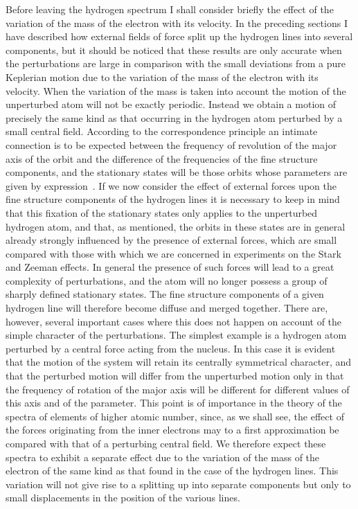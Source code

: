  Before leaving the hydrogen
spectrum I shall consider briefly the effect of the variation of
the mass of the electron with its velocity. In the preceding sections
I have described how external fields of force split up the hydrogen
lines into several components, but it should be noticed that these
results are only accurate when the perturbations are large in comparison
with the small deviations from a pure Keplerian motion
due to the variation of the mass of the electron with its velocity.
When the variation of the mass is taken into account the motion
of the unperturbed atom will not be exactly periodic. Instead we
obtain a motion of precisely the same kind as that occurring in the
hydrogen atom perturbed by a small central field. According to
the correspondence principle an intimate connection is to be expected
between the frequency of revolution of the major axis of the
orbit and the difference of the frequencies of the fine structure
components, and the stationary states will be those orbits whose
parameters are given by expression~. If we now consider the
effect of external forces upon the fine structure components of the
hydrogen lines it is necessary to keep in mind that this fixation of
the stationary states only applies to the unperturbed hydrogen
atom, and that, as mentioned, the orbits in these states are in
general already strongly influenced by the presence of external
forces, which are small compared with those with which we are
concerned in experiments on the Stark and Zeeman effects. In
general the presence of such forces will lead to a great complexity
of perturbations, and the atom will no longer possess a group of
sharply defined stationary states. The fine structure components
of a given hydrogen line will therefore become diffuse and merged
together. There are, however, several important cases where this
does not happen on account of the simple character of the perturbations.
The simplest example is a hydrogen atom perturbed
by a central force acting from the nucleus. In this case it is evident
that the motion of the system will retain its centrally symmetrical
character, and that the perturbed motion will differ from the unperturbed
motion only in that the frequency of rotation of the major
axis will be different for different values of this axis and of the
parameter. This point is of importance in the theory of the
spectra of elements of higher atomic number, since, as we shall see,
the effect of the forces originating from the inner electrons may
to a first approximation be compared with that of a perturbing
central field. We  therefore expect these spectra to exhibit
a separate effect due to the variation of the mass of the electron
of the same kind as that found in the case of the hydrogen lines.
This variation will not give rise to a splitting up into separate
components but only to small displacements in the position of the
various lines.


